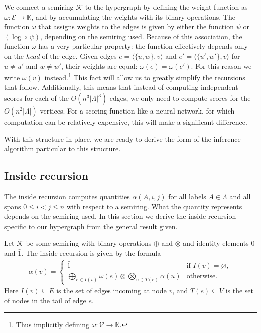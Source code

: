     We connect a semiring $\mathcal{K}$ to the hypergraph by defining the weight function as $\omega: \mathcal{E} \to \mathbb{K}$, and by accumulating the weights with its binary operations. The function $\omega$ that assigns weights to the edges is given by either the function $\psi$ or $(\log \circ \, \psi)$, depending on the semiring used. Because of this association, the function $\omega$ has a very particular property: the function effectively depends only on the \textit{head} of the edge. Given edges $e = \langle \{ u, w \}, v \rangle$ and $e' =  \langle \{ u', w' \}, v \rangle$ for $u \neq u'$ and $w \neq w'$, their weights are equal: $\omega(e) = \omega(e')$. For this reason we write $\omega(v)$ instead.\footnote{Thus implicitly defining $\omega: \mathcal{V} \to \mathbb{K}$.} This fact will allow us to greatly simplify the recursions that follow. Additionally, this means that instead of computing independent scores for each of the $O(n^3 \vert\Lambda\rvert^3)$ edges, we only need to compute scores for the $O(n^2 \vert\Lambda\rvert)$ vertices. For a scoring function like a neural network, for which computation can be relatively expensive, this will make a significant difference.

   With this structure in place, we are ready to derive the form of the inference algorithm particular to this structure.

  \subsection{Inside recursion}
    The inside recursion computes quantities $\alpha(A,i,j)$ for all labels $A \in \Lambda$ and all spans $0 \leq i < j \leq n$ with respect to a semiring. What the quantity represents depends on the semiring used. In this section we derive the inside recursion specific to our hypergraph from the general result given.

    Let $\mathcal{K}$ be some semiring with binary operations $\oplus$ and $\otimes$ and identity elements $\bar{0}$ and $\bar{1}$. The inside recursion is given by the formula \citep{goodman1999semiring}
    \begin{align*}
      \alpha(v) =
        \begin{cases}
          \bar{1}  &  \mbox{if } I(v) = \varnothing,  \\
          \displaystyle\bigoplus_{e \in I(v)} \omega(e) \otimes \displaystyle\bigotimes_{u \in T(e)} \alpha(u)  & \mbox{otherwise.}
        \end{cases}
    \end{align*}
    Here $I(v) \subseteq E$ is the set of edges incoming at node $v$, and $T(e) \subseteq V$ is the set of nodes in the tail of edge $e$.

